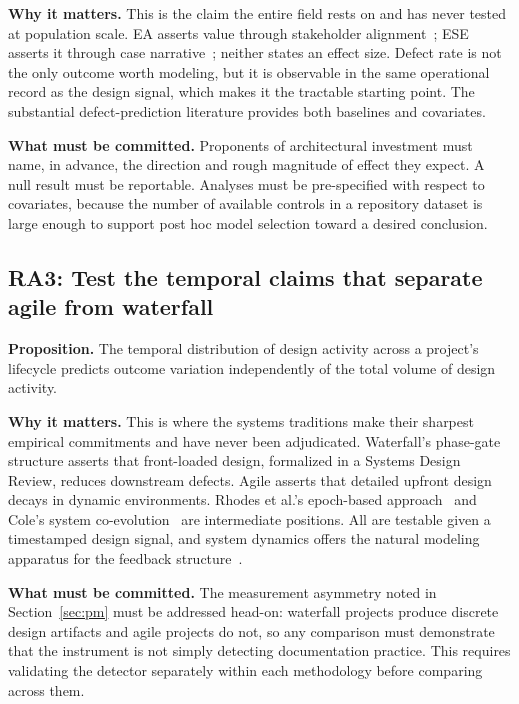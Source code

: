 \documentclass[11pt,a4paper]{article}
\begin{document}
\textbf{Why it matters.} This is the claim the entire field rests on and has
never tested at population scale. EA asserts value through stakeholder
alignment~\citep{gong2019}; ESE asserts it through case
narrative~\citep{kotze2016}; neither states an effect size. Defect rate is not
the only outcome worth modeling, but it is observable in the same operational
record as the design signal, which makes it the tractable starting point. The
substantial defect-prediction literature provides both baselines and covariates.

\textbf{What must be committed.} Proponents of architectural investment must
name, in advance, the direction and rough magnitude of effect they expect. A
null result must be reportable. Analyses must be pre-specified with respect to
covariates, because the number of available controls in a repository dataset is
large enough to support post hoc model selection toward a desired conclusion.

\subsection{RA3: Test the temporal claims that separate agile from waterfall}

\textbf{Proposition.} The temporal distribution of design activity across a
project's lifecycle predicts outcome variation independently of the total volume
of design activity.

\textbf{Why it matters.} This is where the systems traditions make their
sharpest empirical commitments and have never been adjudicated. Waterfall's
phase-gate structure asserts that front-loaded design, formalized in a Systems
Design Review, reduces downstream defects. Agile asserts that detailed upfront
design decays in dynamic environments. Rhodes et al.'s epoch-based
approach~\citep{rhodes2009} and Cole's system co-evolution~\citep{cole2006} are
intermediate positions. All are testable given a timestamped design signal, and
system dynamics offers the natural modeling apparatus for the feedback
structure~\citep{forrester2009,khatun2023}.

\textbf{What must be committed.} The measurement asymmetry noted in
Section~\ref{sec:pm} must be addressed head-on: waterfall projects produce
discrete design artifacts and agile projects do not, so any comparison must
demonstrate that the instrument is not simply detecting documentation practice.
This requires validating the detector separately within each methodology before
comparing across them.
\end{document}
